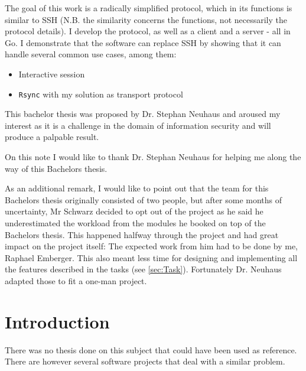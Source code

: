 \documentclass[10pt,a4paper,titlepage,twoside,english,final]{zhawreprt}
\begin{document}
The goal of this work is a radically simplified protocol, which in its functions is similar to \gls{SSH} (N.B. the similarity concerns the functions, not necessarily the protocol details).
I develop the protocol, as well as a client and a server - all in \gls{Go}.
I demonstrate that the software can replace \gls{SSH} by showing that it can handle several common use cases, among them:

\begin{itemize}
\item Interactive session
\item \texttt{Rsync} with my solution as transport protocol
\end{itemize}

This bachelor thesis was proposed by Dr. Stephan Neuhaus \citep{BA19_neut_03} and aroused my interest as it is a challenge in the domain of information security and will produce a palpable result.

On this note I would like to thank Dr. Stephan Neuhaus for helping me along the way of this Bachelors thesis.

As an additional remark, I would like to point out that the team for this Bachelors thesis originally consisted of two people, but after some months of uncertainty, Mr Schwarz decided to opt out of the project as he said he underestimated the workload from the modules he booked on top of the Bachelors thesis.
This happened halfway through the project and had great impact on the project itself:
The expected work from him had to be done by me, Raphael Emberger.
This also meant less time for designing and implementing all the features described in the tasks (see \ref{sec:Task}).
Fortunately Dr. Neuhaus adapted those to fit a one-man project.

\makedeclarationoforiginality

\tableofcontents

\cleardoublepage
{}
\setcounter{page}{1}

\chapter{Introduction}\label{chp:Introduction}
There was no thesis done on this subject that could have been used as reference.
There are however several software projects that deal with a similar problem.
\end{document}
